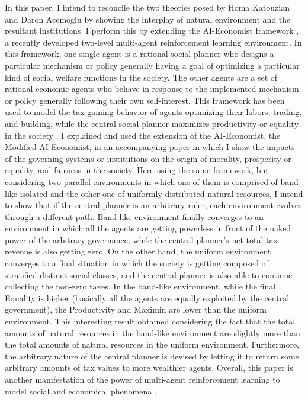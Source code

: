 \documentclass{article}
\begin{document}
In this paper, I intend to reconcile the two theories posed by Homa Katouzian and Daron Acemoglu by showing the interplay of natural environment and the resultant institutions. I perform this by extending the AI-Economist framework \citep{Zheng2022}, a recently developed two-level multi-agent reinforcement learning environment. In this framework, one single agent is a rational social planner who designs a particular mechanism or policy generally having a goal of optimizing a particular kind of social welfare functions in the society. The other agents are a set of rational economic agents who behave in response to the implemented mechanism or policy generally following their own self-interest. This framework has been used to model the tax-gaming behavior of agents \textendash optimizing their labors, trading, and building, while the central social planner maximizes productivity or equality in the society \citep{Zheng2022}. I explained and used the extension of the AI-Economist, the Modified AI-Economist, in an accompanying paper \citep{Dizaji2023a} in which I show the impacts of the governing systems or institutions on the origin of morality, prosperity or equality, and fairness in the society. Here using the same framework, but considering two parallel environments in which one of them is comprised of band-like isolated and the other one of uniformly distributed natural resources, I intend to show that if the central planner is an arbitrary ruler, each environment evolves through a different path. Band-like environment finally converges to an environment in which all the agents are getting powerless in front of the naked power of the arbitrary governance, while the central planner's net total tax revenue is also getting zero. On the other hand, the uniform environment converges to a final situation in which the society is getting composed of stratified distinct social classes, and the central planner is also able to continue collecting the non-zero taxes. In the band-like environment, while the final Equality is higher (basically all the agents are equally exploited by the central government), the Productivity and Maximin are lower than the uniform environment. This interesting result obtained considering the fact that the total amounts of natural resources in the band-like environment are slightly more than the total amounts of natural resources in the uniform environment. Furthermore, the arbitrary nature of the central planner is devised by letting it to return some arbitrary amounts of tax values to more wealthier agents. Overall, this paper is another manifestation of the power of multi-agent reinforcement learning to model social and economical phenomena \citep{Trott2021, Zheng2022, Zhang2022, Leibo2019, Leibo2021, Johanson2022}.
\end{document}
